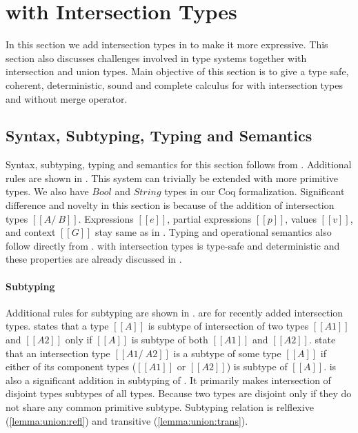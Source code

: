 \section{\cal with Intersection Types}
\label{sec:inter}
In this section we add intersection types in \cal to make it more expressive. This section also
discusses challenges involved in type systems together with intersection and union types.
Main objective of this section is to give a type safe, coherent, deterministic, sound and complete
calculus for \cal with intersection types and without merge operator.

\subsection{Syntax, Subtyping, Typing and Semantics}
\label{sec:inter:system}
Syntax, subtyping, typing and semantics for this section follows from .
Additional rules are shown in . This system can trivially be extended with
more primitive types. We also have $Bool$ and $String$ types in our Coq formalization.
Significant difference and novelty in this section is because of the addition of intersection types 
$[[A /\ B]]$. Expressions $[[e]]$, partial expressions $[[p]]$, values $[[v]]$, and context $[[G]]$
stay same as in .
Typing and operational semantics also follow directly from .
\cal with intersection types is type-safe and deterministic and these properties are already discussed
in .

\paragraph{Subtyping}
Additional rules for subtyping are shown in .
 are for recently added intersection types.  states that
a type $[[A]]$ is subtype of intersection of two types $[[A1]]$ and $[[A2]]$ only if $[[A]]$ is 
subtype of both $[[A1]]$ and $[[A2]]$.  state that an intersection type 
$[[A1 /\ A2]]$ is a subtype of some type $[[A]]$ if either of its component types ($[[A1]]$ or $[[A2]]$)
is subtype of $[[A]]$.  is also a significant addition in subtyping of \cal. It primarily
makes intersection of disjoint types subtypes of all types. 
Because two types are disjoint only if they do not share any common primitive subtype.
Subtyping relation is relflexive (\cref{lemma:union:refl}) and transitive (\cref{lemma:union:trans}).


